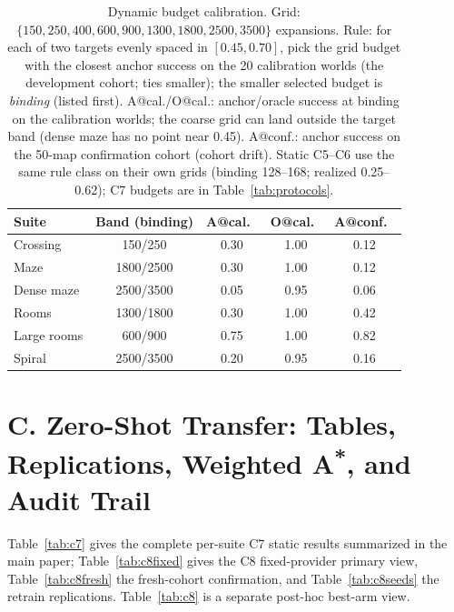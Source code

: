 \documentclass[letterpaper]{article} %
\newcommand{\stage}[1]{\textsc{#1}}
\begin{document}
\begin{table}[t]
\centering
\small
\setlength{\tabcolsep}{2.6pt}
\begin{tabular}{@{}lcccc@{}}
\toprule
Suite & Band (binding) & A@cal.\ & O@cal.\ & A@conf.\ \\
\midrule
Crossing & 150/250 & 0.30 & 1.00 & 0.12 \\
Maze & 1800/2500 & 0.30 & 1.00 & 0.12 \\
Dense maze & 2500/3500 & 0.05 & 0.95 & 0.06 \\
Rooms & 1300/1800 & 0.30 & 1.00 & 0.42 \\
Large rooms & 600/900 & 0.75 & 1.00 & 0.82 \\
Spiral & 2500/3500 & 0.20 & 0.95 & 0.16 \\
\bottomrule
\end{tabular}
\caption{Dynamic budget calibration. Grid: $\{150, 250, 400, 600, 900, 1300, 1800, 2500, 3500\}$ expansions. Rule: for each of two targets evenly spaced in $[0.45, 0.70]$, pick the grid budget with the closest anchor success on the 20 calibration worlds (the development cohort; ties smaller); the smaller selected budget is \emph{binding} (listed first). A@cal./O@cal.: anchor/oracle success at binding on the calibration worlds; the coarse grid can land outside the target band (dense maze has no point near 0.45). A@conf.: anchor success on the 50-map confirmation cohort (cohort drift). Static \stage{C5}--\stage{C6} use the same rule class on their own grids (binding 128--168; realized 0.25--0.62); \stage{C7} budgets are in Table~\ref{tab:protocols}.}
\label{tab:calib}
\end{table}

\clearpage
\section{C. Zero-Shot Transfer: Tables, Replications, Weighted A\textsuperscript{*}, and Audit Trail}

Table~\ref{tab:c7} gives the complete per-suite \stage{C7} static results summarized in the main paper; Table~\ref{tab:c8fixed} gives the \stage{C8} fixed-provider primary view, Table~\ref{tab:c8fresh} the fresh-cohort confirmation, and Table~\ref{tab:c8seeds} the retrain replications. Table~\ref{tab:c8} is a separate post-hoc best-arm view.
\end{document}

